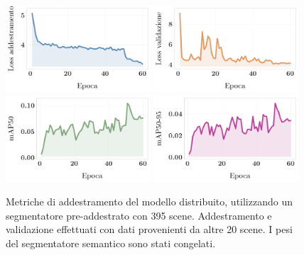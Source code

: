 \documentclass[12pt]{report}
\begin{document}
\begin{figure}[h!]
	\centering
	{\includegraphics[width=0.48\textwidth]{images/fog-robotics/real-to-real/10/train-loss}}
	\hspace{0.01\textwidth}
	{\includegraphics[width=0.48\textwidth]{images/fog-robotics/real-to-real/10/validation-loss}}
	\hspace{0.01\textwidth}
	\\
	{\includegraphics[width=0.48\textwidth]{images/fog-robotics/real-to-real/10/map50}}
	\hspace{0.01\textwidth}
	{\includegraphics[width=0.48\textwidth]{images/fog-robotics/real-to-real/10/map50-95}}
	\caption{Metriche di addestramento del modello distribuito, utilizzando un segmentatore pre-addestrato con 395 scene. Addestramento e validazione effettuati con dati provenienti da altre 20 scene. I pesi del segmentatore semantico sono stati congelati.}
	\label{fig:training-8}
\end{figure}
\end{document}
